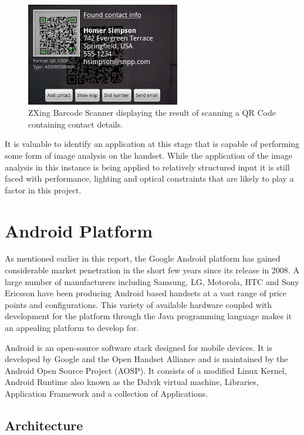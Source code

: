 \begin{figure}[h!]
\centering
    \includegraphics[width=0.6\textwidth]{research/images/zxing_barcode.jpeg}
	
	\caption[ZXing Barcode Scanner]%
    {ZXing Barcode Scanner displaying the result of scanning a QR Code containing contact details.}
	\label{zxing_scanner}
\end{figure}

It is valuable to identify an application at this stage that is capable of performing some form of image analysis on the handset. While the application of the image analysis in this instance is being applied to relatively structured input it is still faced with performance, lighting and optical constraints that are likely to play a factor in this project.

\section{Android Platform}
As mentioned earlier in this report, the Google Android platform has gained considerable market penetration in the short few years since its release in 2008. A large number of manufacturers including Samsung, LG, Motorola, HTC and Sony Ericsson have been producing Android based handsets at a vast range of price points and configurations. This variety of available hardware coupled with development for the platform through the Java programming language makes it an appealing platform to develop for.

Android is an open-source software stack designed for mobile devices. It is developed by Google and the Open Handset Alliance and is maintained by the Android Open Source Project (AOSP). It consists of a modified Linux Kernel, Android Runtime also known as the Dalvik virtual machine, Libraries, Application Framework and a collection of Applications.

\subsection{Architecture}
